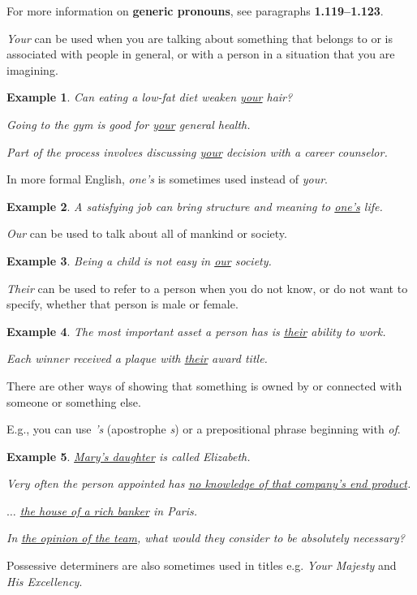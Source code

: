 \documentclass[oneside]{book}
\numberwithin{equation}{section}
\newtheorem{example}{Example}[section]
\begin{document}
For more information on \textbf{generic pronouns}, see paragraphs \textbf{1.119--1.123}.

%
\textit{Your} can be used when you are talking about something that belongs to or is associated with people in general, or with a person in a situation that you are imagining.
\begin{example}
    Can eating a low-fat diet weaken \underline{your} hair?
    
    Going to the gym is good for \underline{your} general health.
    
    Part of the process involves discussing \underline{your} decision with a career counselor.
\end{example}
In more formal English, \textit{one's} is sometimes used instead of \textit{your}.
\begin{example}
    A satisfying job can bring structure and meaning to \underline{one's} life.
\end{example}
\textit{Our} can be used to talk about all of mankind or society.
\begin{example}
    Being a child is not easy in \underline{our} society.
\end{example}
\textit{Their} can be used to refer to a person when you do not know, or do not want to specify, whether that person is male or female.
\begin{example}
    The most important asset a person has is \underline{their} ability to work.
    
    Each winner received a plaque with \underline{their} award title.
\end{example}
%
\noindent{} There are other ways of showing that something is owned by or connected with someone or something else.

E.g., you can use \textit{'s} (apostrophe \textit{s}) or a prepositional phrase beginning with \textit{of}.
\begin{example}
    \underline{Mary's daughter} is called Elizabeth.
    
    Very often the person appointed has \underline{no knowledge of that company's end product}.
    
    $\ldots$ \underline{the house of a rich banker} in Paris.
    
    In \underline{the opinion of the team}, what would they consider to be absolutely necessary?
\end{example}
%
\noindent{} Possessive determiners are also sometimes used in titles e.g. \textit{Your Majesty} and \textit{His Excellency}.
\end{document}
